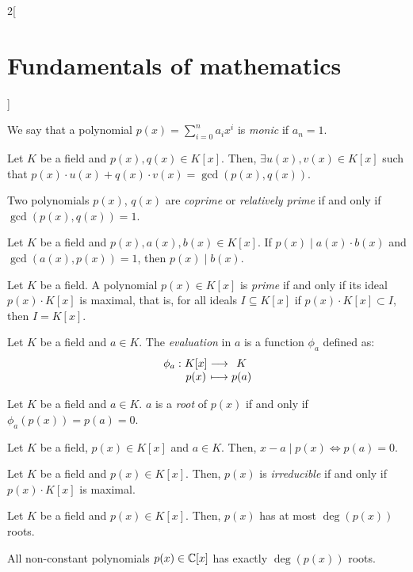 \documentclass[../../../main.tex]{subfiles}
\begin{document}
\begin{multicols}{2}[\section{Fundamentals of mathematics}]
\begin{definition}
  \end{definition}
  \begin{definition}
    We say that a polynomial $p(x)=\sum_{i=0}^na_ix^i$ is \emph{monic} if $a_n=1$.
  \end{definition}
  \begin{theorem}
    Let $K$ be a field and $p(x),q(x)\in K[x]$. Then, $\exists u(x), v(x)\in K[x]$ such that $p(x)\cdot u(x)+q(x)\cdot v(x)=\gcd(p(x),q(x))$.
  \end{theorem}
  \begin{definition}
    Two polynomials $p(x)$, $q(x)$ are \emph{coprime} or \emph{relatively prime} if and only if $\gcd(p(x),q(x))=1$.
  \end{definition}
  \begin{theorem}
    Let $K$ be a field and $p(x),a(x),b(x)\in K[x]$. If $p(x)\mid a(x)\cdot b(x)$ and $\gcd(a(x),p(x))=1$, then $p(x)\mid b(x)$.
  \end{theorem}
  \begin{definition}
    Let $K$ be a field. A polynomial $p(x)\in K[x]$ is \emph{prime} if and only if its ideal $p(x)\cdot K[x]$ is maximal, that is, for all ideals $I\subseteq K[x]$ if $p(x)\cdot K[x] \subset I$, then $I=K[x]$.
  \end{definition}
  \begin{definition}
    Let $K$ be a field and $a\in K$. The \emph{evaluation} in $a$ is a function $\phi_a$ defined as:
    $$\function{\phi_a}{K[x]}{K}{p(x)}{p(a)}$$
  \end{definition}
  \begin{definition}
    Let $K$ be a field and $a\in K$. $a$ is a \emph{root} of $p(x)$ if and only if $\phi_a(p(x))=p(a)=0$.
  \end{definition}
  \begin{theorem}
    Let $K$ be a field, $p(x)\in K[x]$ and $a\in K$. Then, $x-a\mid p(x)\iff p(a)=0$.
  \end{theorem}
  \begin{definition}
    Let $K$ be a field and $p(x)\in K[x]$. Then, $p(x)$ is \emph{irreducible} if and only if $p(x)\cdot K[x]$ is maximal.
  \end{definition}
  \begin{theorem}
    Let $K$ be a field and $p(x)\in K[x]$. Then, $p(x)$ has at most $\deg(p(x))$ roots.
  \end{theorem}
  \begin{theorem}
    All non-constant polynomials $p(x)\in\mathbb{C}[x]$ has exactly $\deg(p(x))$ roots.

\end{theorem}
\end{multicols}
\end{document}
